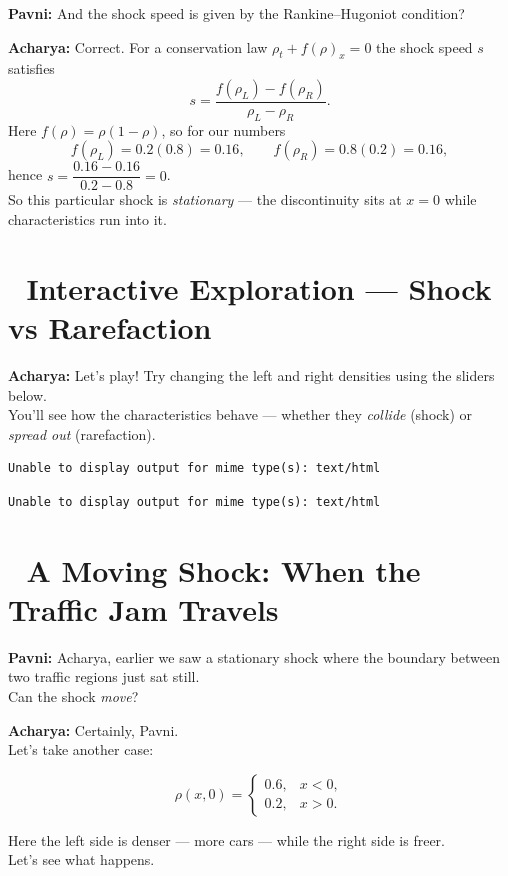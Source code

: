 \documentclass[
  letterpaper,
]{book}
\begin{document}
\textbf{Pavni:} And the shock speed is given by the Rankine--Hugoniot
condition?

\textbf{Acharya:} Correct. For a conservation law
\(\rho_t + f(\rho)_x=0\) the shock speed \(s\) satisfies \[
s = \frac{f(\rho_L)-f(\rho_R)}{\rho_L-\rho_R}.
\] Here \(f(\rho)=\rho(1-\rho)\), so for our numbers \[
f(\rho_L)=0.2(0.8)=0.16,\qquad f(\rho_R)=0.8(0.2)=0.16,
\] hence \(s = \dfrac{0.16-0.16}{0.2-0.8}=0\).\\
So this particular shock is \emph{stationary} --- the discontinuity sits
at \(x=0\) while characteristics run into it.

\section{🚗 Interactive Exploration --- Shock vs
Rarefaction}\label{interactive-exploration-shock-vs-rarefaction}

\textbf{Acharya:} Let's play! Try changing the left and right densities
using the sliders below.\\
You'll see how the characteristics behave --- whether they
\emph{collide} (shock) or \emph{spread out} (rarefaction).

\begin{verbatim}
Unable to display output for mime type(s): text/html
\end{verbatim}

\begin{verbatim}
Unable to display output for mime type(s): text/html
\end{verbatim}

\section{🚦 A Moving Shock: When the Traffic Jam
Travels}\label{a-moving-shock-when-the-traffic-jam-travels}

\textbf{Pavni:} Acharya, earlier we saw a stationary shock where the
boundary between two traffic regions just sat still.\\
Can the shock \emph{move}?

\textbf{Acharya:} Certainly, Pavni.\\
Let's take another case:

\[
\rho(x,0) =
\begin{cases}
0.6, & x < 0,\\
0.2, & x > 0.
\end{cases}
\]

Here the left side is denser --- more cars --- while the right side is
freer.\\
Let's see what happens.
\end{document}
